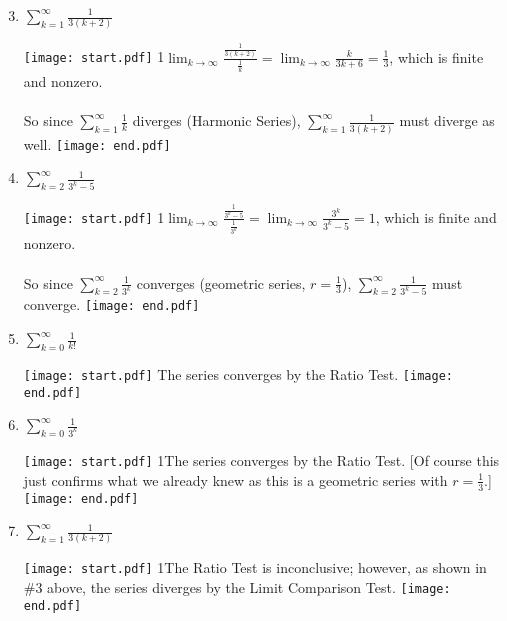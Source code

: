 \documentclass[12pt]{article}
\begin{document}

\begin{enumerate}
\setcounter{enumi}{2}

\item $\sum_{k=1}^{\infty}{\frac{1}{3(k+2)}}$

\texttt{[image: start.pdf]}
{{{1\linewidth}{$\lim_{k \rightarrow \infty}{\frac{\frac{1}{3(k+2)}}{\frac{1}{k}}}=\lim_{k \rightarrow \infty}{\frac{k}{3k+6}}=\frac{1}{3}$, which is finite and nonzero. 
\\ \\ So since $\sum_{k=1}^{\infty}{\frac{1}{k}}$ diverges (Harmonic Series), $\sum_{k=1}^{\infty}{\frac{1}{3(k+2)}}$ must diverge as well.   }}}
\texttt{[image: end.pdf]}


\item $\sum_{k=2}^{\infty}{\frac{1}{3^k-5}}$

\texttt{[image: start.pdf]}
{{{1\linewidth}{$\lim_{k \rightarrow \infty}{\frac{\frac{1}{3^k-5}}{\frac{1}{3^k}}}=\lim_{k \rightarrow \infty}{\frac{3^k}{3^k-5}}=1$, which is finite and nonzero. 
\\ \\ So since $\sum_{k=2}^{\infty}{\frac{1}{3^k}}$ converges (geometric series, $\textstyle r=\frac{1}{3}$), $\sum_{k=2}^{\infty}{\frac{1}{3^k-5}}$ must converge.   }}}
\texttt{[image: end.pdf]}



\end{enumerate}


\begin{enumerate}
\setcounter{enumi}{4}

\item $\sum_{k=0}^{\infty}{\frac{1}{k!}}$

\texttt{[image: start.pdf]}
{{The series converges by the Ratio Test.}}
\texttt{[image: end.pdf]}


\item $\sum_{k=0}^{\infty}{\frac{1}{3^k}}$

\texttt{[image: start.pdf]}
{{{1\linewidth}{The series converges by the Ratio Test. [Of course this just confirms what we already knew as this is a geometric series with $\textstyle r=\frac{1}{3}$.] }}}
\texttt{[image: end.pdf]}


\item $\sum_{k=1}^{\infty}{\frac{1}{3(k+2)}}$

\texttt{[image: start.pdf]}
{{{1\linewidth}{The Ratio Test is inconclusive; however, as shown in \#3 above, the series diverges by the Limit Comparison Test.}}}
\texttt{[image: end.pdf]}


\end{enumerate}
\end{document}
